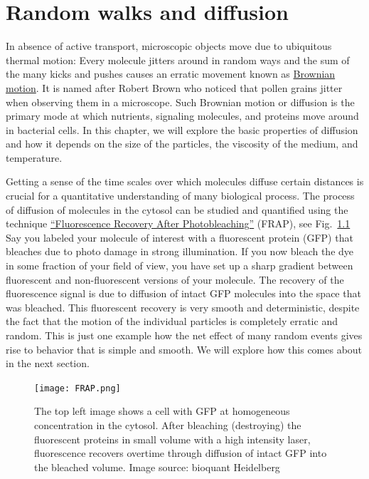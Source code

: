 \chapter{Random walks and diffusion}

In absence of active transport, microscopic objects move due to ubiquitous thermal motion:
Every molecule jitters around in random ways and the sum of the many kicks and pushes causes an erratic movement known as \href{https://en.wikipedia.org/wiki/Brownian_motion}{Brownian motion}.
It is named after Robert Brown who noticed that pollen grains jitter when observing them in a microscope.
Such Brownian motion or diffusion is the primary mode at which nutrients, signaling molecules, and proteins move around in bacterial cells.
In this chapter, we will explore the basic properties of diffusion and how it depends on the size of the particles, the viscosity of the medium, and temperature.

Getting a sense of the time scales over which molecules diffuse certain distances is crucial for a quantitative understanding of many biological process.
The process of diffusion of molecules in the cytosol can be studied and quantified using the technique \href{https://en.wikipedia.org/wiki/Fluorescence_recovery_after_photobleaching}{``Fluorescence Recovery After Photobleaching''} (FRAP), see Fig.~\ref{fig:FRAP}
Say you labeled your molecule of interest with a fluorescent protein (GFP) that bleaches due to photo damage in strong illumination.
If you now bleach the dye in some fraction of your field of view, you have set up a sharp gradient between fluorescent and non-fluorescent versions of your molecule.
The recovery of the fluorescence signal is due to diffusion of intact GFP molecules into the space that was bleached.
This fluorescent recovery is very smooth and deterministic, despite the fact that the motion of the individual particles is completely erratic and random.
This is just one example how the net effect of many random events gives rise to behavior that is simple and smooth.
We will explore how this comes about in the next section.

\begin{figure}[tb]
	\centering
	\texttt{[image: FRAP.png]}
	\caption{The top left image shows a cell with GFP at homogeneous concentration in the cytosol. After bleaching (destroying) the fluorescent proteins in small volume with a high intensity laser, fluorescence recovers overtime through diffusion of intact GFP into the bleached volume.  Image source: bioquant Heidelberg}
	\label{fig:FRAP}
\end{figure}

